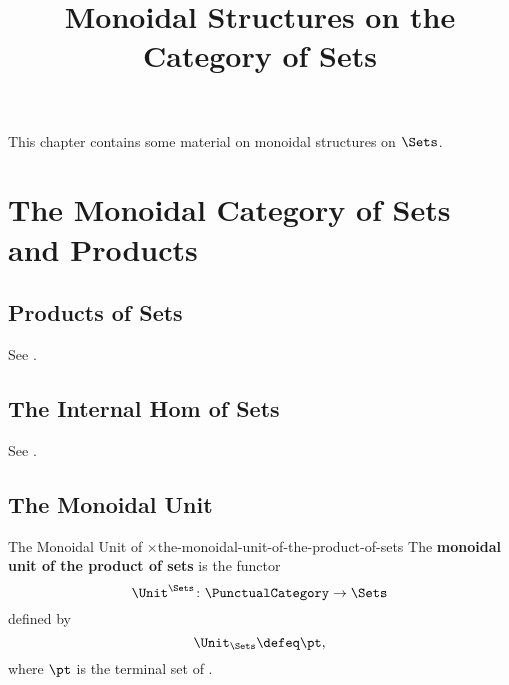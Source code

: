 

%



\title{Monoidal Structures on the Category of Sets}

\maketitle

\label{section-phantom}

This chapter contains some material on monoidal structures on $\Sets$.

\ChapterTableOfContents

\section{The Monoidal Category of Sets and Products}\label{section-the-monoidal-category-of-sets-and-products}
\subsection{Products of Sets}\label{subsection-the-monoidal-category-of-sets-and-products-products-of-sets}
See .
\subsection{The Internal Hom of Sets}\label{subsection-the-monoidal-category-of-sets-and-products-the-internal-hom-of-sets}
See .
\subsection{The Monoidal Unit}\label{subsection-the-monoidal-category-of-sets-and-products-the-monoidal-unit-of-the-product-of-sets}
\begin{definition}{The Monoidal Unit of $\times$}{the-monoidal-unit-of-the-product-of-sets}%
    The \textbf{monoidal unit of the product of sets} is the functor
    \[
        \Unit^{\Sets}
        \colon
        \PunctualCategory
        \to
        \Sets
    \]
    defined by
    \[
        \Unit_{\Sets}%
        \defeq%
        \pt,
    \]%
    where $\pt$ is the terminal set of .
\end{definition}
